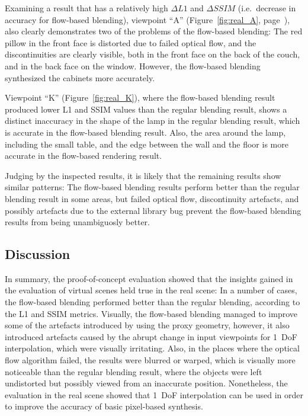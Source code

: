 Examining a result that has a relatively high $\Delta L1$ and $\Delta SSIM$ (i.e.\ decrease in accuracy for flow-based blending), viewpoint ``A'' (Figure~\ref{fig:real_A}, page~\pageref{fig:real_A}), also clearly demonstrates two of the problems of the flow-based blending: The red pillow in the front face is distorted due to failed optical flow, and the discontinuities are clearly visible, both in the front face on the back of the couch, and in the back face on the window. However, the flow-based blending synthesized the cabinets more accurately.

Viewpoint ``K'' (Figure~\ref{fig:real_K}), where the flow-based blending result produced lower L1 and SSIM values than the regular blending result, shows a distinct inaccuracy in the shape of the lamp in the regular blending result, which is accurate in the flow-based blending result. Also, the area around the lamp, including the small table, and the edge between the wall and the floor is more accurate in the flow-based rendering result.

Judging by the inspected results, it is likely that the remaining results show similar patterns: The flow-based blending results perform better than the regular blending result in some areas, but failed optical flow, discontinuity artefacts, and possibly artefacts due to the external library bug prevent the flow-based blending results from being unambiguosly better.

\subsection{Discussion}
In summary, the proof-of-concept evaluation showed that the insights gained in the evaluation of virtual scenes held true in the real scene: 
In a number of cases, the flow-based blending performed better than the regular blending, according to the L1 and SSIM metrics.
Visually, the flow-based blending managed to improve some of the artefacts introduced by using the proxy geometry, however, it also introduced artefacts caused by the abrupt change in input viewpoints for 1~DoF interpolation, which were visually irritating.
Also, in the places where the optical flow algorithm failed, the results were blurred or warped, which is visually more noticeable than the regular blending result, where the objects were left undistorted but possibly viewed from an inaccurate position.
Nonetheless, the evaluation in the real scene showed that 1~DoF interpolation can be used in order to improve the accuracy of basic pixel-based synthesis.


